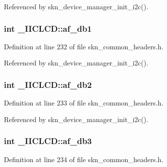 Referenced by skn\+\_\+device\+\_\+manager\+\_\+init\+\_\+i2c().

\subsubsection[{\texorpdfstring{af\+\_\+db1}{af_db1}}]{\setlength{\rightskip}{0pt plus 5cm}int \+\_\+\+I\+I\+C\+L\+C\+D\+::af\+\_\+db1}\hypertarget{struct___i_i_c_l_c_d_a114a5f81c889fe857d714a3a5033b397}{}\label{struct___i_i_c_l_c_d_a114a5f81c889fe857d714a3a5033b397}


Definition at line 232 of file skn\+\_\+common\+\_\+headers.\+h.



Referenced by skn\+\_\+device\+\_\+manager\+\_\+init\+\_\+i2c().

\subsubsection[{\texorpdfstring{af\+\_\+db2}{af_db2}}]{\setlength{\rightskip}{0pt plus 5cm}int \+\_\+\+I\+I\+C\+L\+C\+D\+::af\+\_\+db2}\hypertarget{struct___i_i_c_l_c_d_a7b88e6903c8fb93882c396261ffe40b5}{}\label{struct___i_i_c_l_c_d_a7b88e6903c8fb93882c396261ffe40b5}


Definition at line 233 of file skn\+\_\+common\+\_\+headers.\+h.



Referenced by skn\+\_\+device\+\_\+manager\+\_\+init\+\_\+i2c().

\subsubsection[{\texorpdfstring{af\+\_\+db3}{af_db3}}]{\setlength{\rightskip}{0pt plus 5cm}int \+\_\+\+I\+I\+C\+L\+C\+D\+::af\+\_\+db3}\hypertarget{struct___i_i_c_l_c_d_a26f362cb78eb2227a14706e9c992a066}{}\label{struct___i_i_c_l_c_d_a26f362cb78eb2227a14706e9c992a066}


Definition at line 234 of file skn\+\_\+common\+\_\+headers.\+h.



